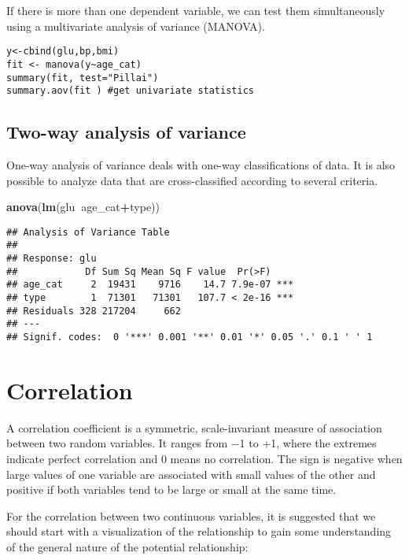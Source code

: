 \documentclass[]{book}
\newenvironment{Shaded}{\begin{snugshade}}{\end{snugshade}}
\newcommand{\KeywordTok}[1]{\textcolor[rgb]{0.13,0.29,0.53}{\textbf{#1}}}
\newcommand{\OperatorTok}[1]{\textcolor[rgb]{0.81,0.36,0.00}{\textbf{#1}}}
\newcommand{\NormalTok}[1]{#1}
\theoremstyle{definition}
\theoremstyle{definition}
\theoremstyle{definition}
\theoremstyle{remark}
\begin{document}
If there is more than one dependent variable, we can test them
simultaneously using a multivariate analysis of variance (MANOVA).

\begin{verbatim}
y<-cbind(glu,bp,bmi)
fit <- manova(y~age_cat)
summary(fit, test="Pillai")
summary.aov(fit ) #get univariate statistics
\end{verbatim}

\subsection{Two-way analysis of
variance}\label{two-way-analysis-of-variance}

One-way analysis of variance deals with one-way classifications of data.
It is also possible to analyze data that are cross-classified according
to several criteria.

\begin{Shaded}
\begin{Highlighting}[]
\KeywordTok{anova}\NormalTok{(}\KeywordTok{lm}\NormalTok{(glu}\OperatorTok{~}\NormalTok{age_cat}\OperatorTok{+}\NormalTok{type))}
\end{Highlighting}
\end{Shaded}

\begin{verbatim}
## Analysis of Variance Table
## 
## Response: glu
##            Df Sum Sq Mean Sq F value  Pr(>F)    
## age_cat     2  19431    9716    14.7 7.9e-07 ***
## type        1  71301   71301   107.7 < 2e-16 ***
## Residuals 328 217204     662                    
## ---
## Signif. codes:  0 '***' 0.001 '**' 0.01 '*' 0.05 '.' 0.1 ' ' 1
\end{verbatim}

\section{Correlation}\label{correlation}

A correlation coefficient is a symmetric, scale-invariant measure of
association between two random variables. It ranges from −1 to +1, where
the extremes indicate perfect correlation and 0 means no correlation.
The sign is negative when large values of one variable are associated
with small values of the other and positive if both variables tend to be
large or small at the same time.

For the correlation between two continuous variables, it is suggested
that we should start with a visualization of the relationship to gain
some understanding of the general nature of the potential relationship:
\end{document}
